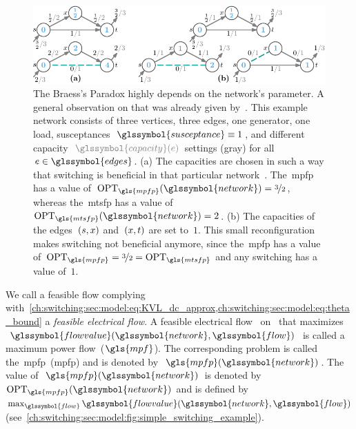 \begin{figure}[t!]%
    \centering\includegraphics{switchplacement/figures/not_benefitial_simple_switching_example.pdf}
    \caption[The Braess's Paradox highly depends on the network's parameters.]{%
    The Braess's Paradox highly depends on the network's parameter. A general
    observation on that was already given by~\textcite{Pas97}. This example
    network consists of three vertices, three edges, one generator, one load,
    susceptances~$\glssymbol{susceptance} \equiv 1$, and different capacity~$
    \textcolor{CAPACITY}{\glssymbol{capacity}(\edge)}$ settings
    (\textcolor{CAPACITY}{gray}) for all~$\edge\in\glssymbol{edges}$. (a) The
    capacities are chosen in such a way that switching is beneficial in that
    particular network~. The~\gls{mpfp} has a value
    of~$\opt_{\gls{mpfp}}(\glssymbol{network}) = \nicefrac{3}{2}$, whereas
    the~\gls{mtsfp} has a value of~$\opt_{\gls{mtsfp}}(
    \glssymbol{network}) = 2$. (b) The capacities of the edges~$(s,x)$
    and~$ (x,t)$ are set to~$1$. This small reconfiguration makes switching
    not beneficial anymore, since the~\gls{mpfp} has a value
    of~$\opt_{\gls{mpfp}} = \nicefrac{3}{2}
    =
    \opt_{\gls{mtsfp}}$ and any switching has a value of~$1$. }%
    \label{ch:switching:sec:model:fig:when_switching_is_not_benefitial}%
\end{figure}%
%

We call a feasible flow complying
with~\cref{ch:switching:sec:model:eq:KVL_dc_approx,ch:switching:sec:model:eq:theta_bound}
a \emph{feasible electrical flow}. A feasible electrical 
flow~ on~
% 
%
that maximizes~$\glssymbol{flowvalue}(\glssymbol{network},\glssymbol{flow})$ 
%
is called a maximum power flow~($\gls{mpf}$). The
corresponding problem is called the~\acrlong{mpfp}~(\gls{mpfp}) and is denoted
by~$\gls{mpfp}(\glssymbol{network})$.
%
%
The value of~$\gls{mpfp}(\glssymbol{network})$ is denoted
by~$\opt_{\gls{mpfp}}(\glssymbol{network})$ and is defined
by~$\max_{\glssymbol{flow}}\glssymbol{flowvalue}(\glssymbol{network},
\glssymbol{flow})$
(see~\cref{ch:switching:sec:model:fig:simple_switching_example}).
% 

